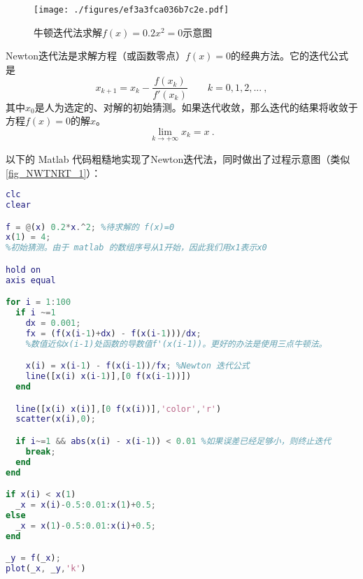

\begin{figure}[ht]
\centering
\texttt{[image: ./figures/ef3a3fca036b7c2e.pdf]}
\caption{牛顿迭代法求解$f(x)=0.2x^2=0$示意图} \label{fig_NWTNRT_1}
\end{figure}

Newton迭代法是求解方程（或函数零点）$f(x)=0$的经典方法。它的迭代公式是
\begin{equation}
x_{k+1} = x_k-\frac{f(x_k)}{f'(x_k)} \qquad k=0,1,2,...~,
\end{equation}
其中$x_0$是人为选定的、对解的初始猜测。如果迭代收敛，那么迭代的结果将收敛于方程$f(x)=0$的解$x$。
$$\lim_{k\to+\infty} x_k = x~.$$

以下的 Matlab 代码粗糙地实现了Newton迭代法，同时做出了过程示意图（类似 \autoref{fig_NWTNRT_1}）：
\begin{lstlisting}[language=matlab]
clc
clear

f = @(x) 0.2*x.^2; %待求解的 f(x)=0
x(1) = 4;  
%初始猜测。由于 matlab 的数组序号从1开始，因此我们用x1表示x0

hold on
axis equal

for i = 1:100
  if i ~=1
    dx = 0.001;
    fx = (f(x(i-1)+dx) - f(x(i-1)))/dx; 
    %数值近似x(i-1)处函数的导数值f'(x(i-1))。更好的办法是使用三点牛顿法。

    x(i) = x(i-1) - f(x(i-1))/fx; %Newton 迭代公式
    line([x(i) x(i-1)],[0 f(x(i-1))])
  end

  line([x(i) x(i)],[0 f(x(i))],'color','r')
  scatter(x(i),0);

  if i~=1 && abs(x(i) - x(i-1)) < 0.01 %如果误差已经足够小，则终止迭代
    break;
  end
end

if x(i) < x(1)
  _x = x(i)-0.5:0.01:x(1)+0.5;
else
  _x = x(1)-0.5:0.01:x(i)+0.5;
end

_y = f(_x);
plot(_x, _y,'k')
\end{lstlisting}
